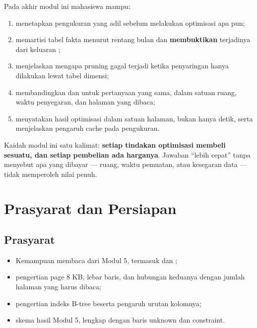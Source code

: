 \begin{capaian}
Pada akhir modul ini mahasiswa mampu:
\begin{enumerate}[leftmargin=1.4em]
  \item menetapkan  pengukuran yang adil sebelum melakukan
        optimisasi apa pun;
  \item memartisi tabel fakta menurut rentang bulan dan \textbf{membuktikan}
        terjadinya  dari keluaran
        ;
  \item menjelaskan mengapa pruning gagal terjadi ketika penyaringan hanya
        dilakukan lewat tabel dimensi;
  \item membandingkan  dan 
        untuk pertanyaan yang sama, dalam satuan ruang, waktu penyegaran, dan
        halaman yang dibaca;
  \item menyatakan hasil optimisasi dalam satuan halaman, bukan hanya detik,
        serta menjelaskan pengaruh cache pada pengukuran.
\end{enumerate}
\end{capaian}

Kaidah modul ini satu kalimat: \textbf{setiap tindakan optimisasi membeli
sesuatu, dan setiap pembelian ada harganya}. Jawaban ``lebih cepat'' tanpa
menyebut apa yang dibayar --- ruang, waktu pemuatan, atau kesegaran data ---
tidak memperoleh nilai penuh.

\section{Prasyarat dan Persiapan}

\subsection{Prasyarat}

\begin{itemize}
  \item Kemampuan membaca  dari Modul 5,
        termasuk  dan ;
  \item pengertian page 8 KB, lebar baris, dan hubungan keduanya dengan jumlah
        halaman yang harus dibaca;
  \item pengertian indeks B-tree beserta pengaruh urutan kolomnya;
  \item skema  hasil Modul 5, lengkap dengan baris unknown dan
        constraint.
\end{itemize}

